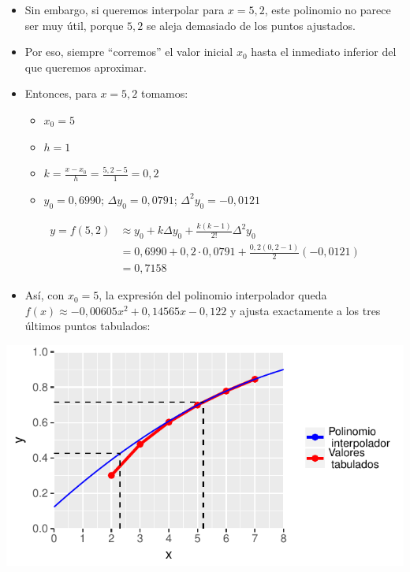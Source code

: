 \documentclass[openany]{book}
\providecommand{\tightlist}{%
  \setlength{\itemsep}{0pt}\setlength{\parskip}{0pt}}
\begin{document}
\begin{itemize}
\item
  Sin embargo, si queremos interpolar para \(x = 5,2\), este polinomio no parece ser muy útil, porque \(5,2\) se aleja demasiado de los puntos ajustados.
\item
  Por eso, siempre ``corremos'' el valor inicial \(x_0\) hasta el inmediato inferior del que queremos aproximar.
\item
  Entonces, para \(x=5,2\) tomamos:

  \begin{itemize}
  \tightlist
  \item
    \(x_0 = 5\)
  \item
    \(h = 1\)
  \item
    \(k = \frac{x-x_0}{h} = \frac{5,2-5}{1} = 0,2\)
  \item
    \(y_0 = 0,6990\); \(\Delta y_0 = 0,0791\); \(\Delta^2 y_0 = -0,0121\)
  \end{itemize}
\end{itemize}

\[
\begin{aligned}
y = f(5,2) &\approx y_0 + k \Delta y_0 + \frac{k(k-1)}{2!}\Delta^2 y_0 \\
  & = 0,6990 + 0,2 \cdot 0,0791 + \frac{0,2 (0,2-1)}{2} (-0,0121) \\
  & = 0,7158
\end{aligned}
\]

\begin{itemize}
\tightlist
\item
  Así, con \(x_0 = 5\), la expresión del polinomio interpolador queda \(f(x) \approx -0,00605 x^2 + 0,14565 x - 0,122\) y ajusta exactamente a los tres últimos puntos tabulados:
\end{itemize}

\begin{center}\includegraphics[width=0.95\linewidth]{Plots/U4/Unidad4_g3} \end{center}
\end{document}
